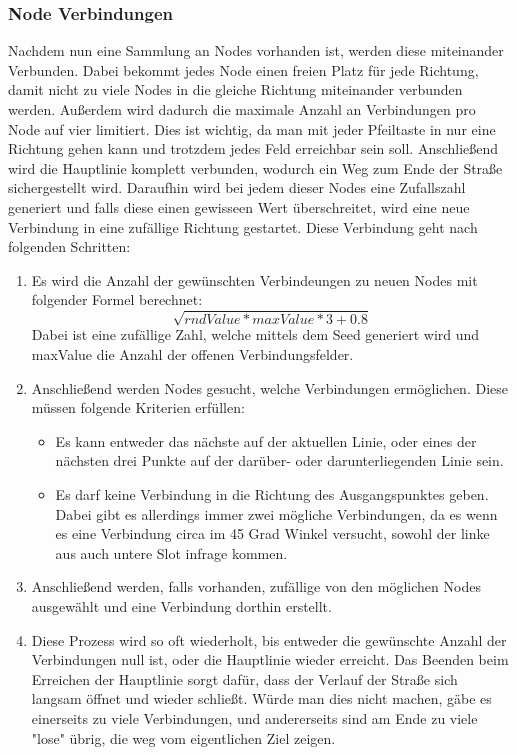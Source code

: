 \subsubsection{Node Verbindungen}\label{subsubsec:node-verbindungen}
Nachdem nun eine Sammlung an Nodes vorhanden ist, werden diese miteinander Verbunden.
Dabei bekommt jedes Node einen freien Platz für jede Richtung, damit nicht zu viele Nodes in die gleiche Richtung miteinander verbunden werden.
Außerdem wird dadurch die maximale Anzahl an Verbindungen pro Node auf vier limitiert.
Dies ist wichtig, da man mit jeder Pfeiltaste in nur eine Richtung gehen kann und trotzdem jedes Feld erreichbar sein soll.
Anschließend wird die Hauptlinie komplett verbunden, wodurch ein Weg zum Ende der Straße sichergestellt wird.
Daraufhin wird bei jedem dieser Nodes eine Zufallszahl generiert und falls diese einen gewisseen Wert überschreitet, wird eine neue Verbindung in eine zufällige Richtung gestartet.
Diese Verbindung geht nach folgenden Schritten:
\begin{enumerate}
    \item Es wird die Anzahl der gewünschten Verbindeungen zu neuen Nodes mit folgender Formel berechnet: \[ \sqrt{rndValue * maxValue * 3 + 0.8}\]
        Dabei ist  eine zufällige Zahl, welche mittels dem Seed generiert wird und maxValue die Anzahl der offenen Verbindungsfelder.
    \item Anschließend werden Nodes gesucht, welche Verbindungen ermöglichen.
    Diese müssen folgende Kriterien erfüllen:
    \begin{itemize}
        \item Es kann entweder das nächste auf der aktuellen Linie, oder eines der nächsten drei Punkte auf der darüber- oder darunterliegenden Linie sein.
        \item Es darf keine Verbindung in die Richtung des Ausgangspunktes geben.
        Dabei gibt es allerdings immer zwei mögliche Verbindungen, da es \zB wenn es eine Verbindung circa im 45 Grad Winkel versucht, sowohl der linke aus auch untere Slot infrage kommen.
    \end{itemize}
    \item Anschließend werden, falls vorhanden, zufällige von den möglichen Nodes ausgewählt und eine Verbindung dorthin erstellt.
    \item Diese Prozess wird so oft wiederholt, bis entweder die gewünschte Anzahl der Verbindungen null ist, oder die Hauptlinie wieder erreicht.
    Das Beenden beim Erreichen der Hauptlinie sorgt dafür, dass der Verlauf der Straße sich langsam öffnet und wieder schließt.
    Würde man dies nicht machen, gäbe es einerseits zu viele Verbindungen, und andererseits sind am Ende zu viele "lose" übrig, die weg vom eigentlichen Ziel zeigen.
\end{enumerate}


